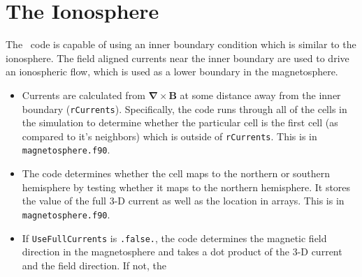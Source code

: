 \section{The Ionosphere}

The \BATSRUS\ code is capable of using an inner boundary condition
which is similar to the ionosphere.  The field aligned currents near
the inner boundary are used to drive an ionospheric flow, which is
used as a lower boundary in the magnetosphere.

\begin{itemize}

\item
Currents are calculated from $\mathbf{\nabla \times B}$ at some
distance away from the inner boundary ({\tt rCurrents}).
Specifically, the code runs through all of the cells in the simulation
to determine whether the particular cell is the first cell (as
compared to it's neighbors) which is outside of {\tt rCurrents}.
This is in {\tt magnetosphere.f90}.

\item
The code determines whether the cell maps to the northern or southern
hemisphere by testing whether it maps to the northern hemisphere. It
stores the value of the full 3-D current as well as the location in
arrays.  This is in {\tt magnetosphere.f90}.

\item
If {\tt UseFullCurrents} is {\tt .false.}, the code determines the
magnetic field direction in the magnetosphere and takes a dot product
of the 3-D current and the field direction.  If not, the 

\end{itemize}
